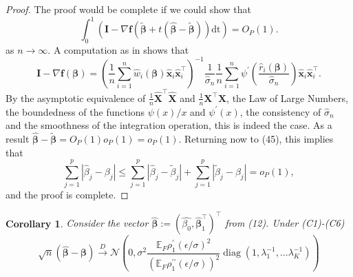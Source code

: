 \documentclass[11pt]{article}
\newtheorem{cor}{Corollary}[section]
\DeclareMathOperator{\diag}{diag}
\begin{document}
\begin{proof}
The proof would be complete if we could show that
\begin{equation*}
\int_{0}^{1} \left(\mathbf{I} -  \nabla \mathbf{f} \left (\boldsymbol{\widetilde{\beta}} + t \left( \boldsymbol{\widehat{\beta}}-\boldsymbol{\widetilde{\beta}} \right) \right) \mathrm{dt} \right) = O_{P}(1).
\end{equation*}
as $n \to \infty$. A computation as in \citep{salibian2002bootstrapping} shows that 
\begin{equation}
\mathbf{I} - \nabla \mathbf{f} (\boldsymbol{\beta}) = \left( \frac{1}{n} \sum_{i=1}^n  
\widehat{w}_i \left( \boldsymbol{\beta} \right)   \widehat{\mathbf{x}}_i \widehat{\mathbf{x}}_i^{\top} \right)^{-1}  \frac{1}{\widehat{\sigma}_n}  \frac{1}{n} \sum_{i=1}^n \psi^{\prime} \left( \frac{\widehat{r}_i \left( \boldsymbol{\beta} \right)}{\widehat{\sigma}_n}  \right) \mathbf{\widehat{x}}_i \mathbf{\widehat{x}}_i^{\top}.
\end{equation}
By the asymptotic equivalence of $\frac{1}{n} \mathbf{\widehat{X}}^{\top} \mathbf{\widehat{X}} $ and $ \frac{1}{n} \mathbf{X}^{\top} \mathbf{X}$, the Law of Large Numbers, the boundedness of the functions $\psi(x)/x$ and $\psi^{\prime}(x)$, the consistency of $\widehat{\sigma}_n$ and the smoothness of the integration operation, this is indeed the case. As a result $\boldsymbol{\widehat{\beta}} - \boldsymbol{\widetilde{\beta}} = O_P(1) o_P(1) = o_P(1)$.  Returning now to (45), this implies that 
\begin{equation}
\sum_{j=1}^p \left| \widehat{\beta}_{j} - \beta_j \right| \leq \sum_{j=1}^p \left|\widehat{\beta}_{j} - \widetilde{\beta}_j \right| + \sum_{j=1}^p \left| \widetilde{\beta}_j - \beta_j  \right| = o_{P}(1),
\end{equation}
and the proof is complete.

\end{proof}

\begin{cor}
Consider the vector $\widehat{\boldsymbol{\beta}} := \left( \widehat{\beta_0}, \widehat{\boldsymbol{\beta}}_1^{\top} \right)^{\top}$ from (12). Under (C1)-(C6)
\begin{equation*}
\sqrt{n}(\widehat{\boldsymbol{\beta}} - \boldsymbol{\beta} ) \xrightarrow{D} \mathcal{N}\left(0,  \sigma^2 \frac{\mathbb{E}_F \rho_{1}^{\prime}(\epsilon/ \sigma)^2}{(\mathbb{E}_F \rho_1^{\prime \prime}(\epsilon/\sigma))^2 } \diag\left(1, \lambda_1^{-1}, \ldots \lambda_K^{-1} \right) \right)
\end{equation*}
\end{cor}
\end{document}

